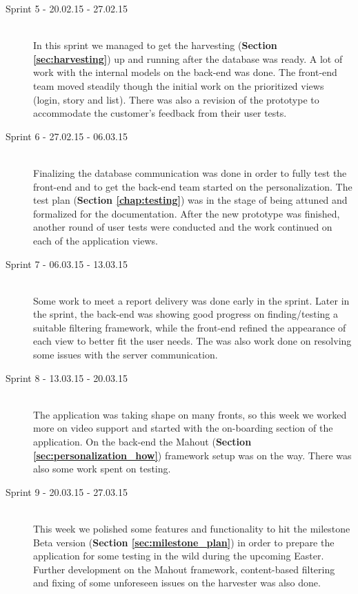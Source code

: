 \begin{description}
	\item[Sprint 5 - 20.02.15 - 27.02.15] \hfill \\ 
	In this sprint we managed to get the harvesting (\textbf {Section \ref{sec:harvesting}}) up and running after the database was ready. A lot of work with the internal models on the back-end was done. The front-end team moved steadily though the initial work on the prioritized views (login, story and list). There was also a revision of the prototype to accommodate the customer's feedback from their user tests.
		
	\item[Sprint 6 - 27.02.15 - 06.03.15] \hfill \\ 
	Finalizing the database communication was done in order to fully test the front-end and to get the back-end team started on the personalization. The test plan (\textbf {Section \ref*{chap:testing}}) was in the stage of being attuned and formalized for the documentation. After the new prototype was finished, another round of user tests were conducted and the work continued on each of the application views.
	
	\item[Sprint 7 - 06.03.15 - 13.03.15] \hfill \\ 
	Some work to meet a report delivery was done early in the sprint. Later in the sprint, the back-end was showing good progress on finding/testing a suitable filtering framework, while the front-end refined the appearance of each view to better fit the user needs. The was also work done on resolving some issues with the server communication.
	
	\item[Sprint 8 - 13.03.15 - 20.03.15] \hfill \\ 
	The application was taking shape on many fronts, so this week we worked more on video support and started with the on-boarding section of the application. On the back-end the Mahout (\textbf {Section \ref{sec:personalization_how}}) framework setup was on the way. There was also some work spent on testing.

	\item[Sprint 9 - 20.03.15 - 27.03.15] \hfill \\ 
	This week we polished some features and functionality to hit the milestone Beta version (\textbf {Section \ref{sec:milestone_plan}}) in order to prepare the application for some testing in the wild during the upcoming Easter. Further development on the Mahout framework, content-based filtering and fixing of some unforeseen issues on the harvester was also done.
	

\end{description}
